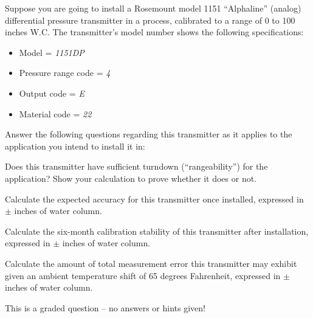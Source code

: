 

Suppose you are going to install a Rosemount model 1151 ``Alphaline'' (analog) differential pressure transmitter in a process, calibrated to a range of 0 to 100 inches W.C.  The transmitter's model number shows the following specifications:

\begin{itemize}
\item{} Model = {\it 1151DP}
\item{} Pressure range code = {\it 4}
\item{} Output code = {\it E}
\item{} Material code = {\it 22}
\end{itemize}

Answer the following questions regarding this transmitter as it applies to the application you intend to install it in:

\vskip 20pt

\item{} Does this transmitter have sufficient turndown (``rangeability'') for the application?  Show your calculation to prove whether it does or not.

\vskip 50pt

\item{} Calculate the expected accuracy for this transmitter once installed, expressed in $\pm$ inches of water column.

\vskip 50pt

\item{} Calculate the six-month calibration stability of this transmitter after installation, expressed in $\pm$ inches of water column.

\vskip 50pt

\item{} Calculate the amount of total measurement error this transmitter may exhibit given an ambient temperature shift of 65 degrees Fahrenheit, expressed in $\pm$ inches of water column.



\vfil 

\eject






This is a graded question -- no answers or hints given!

